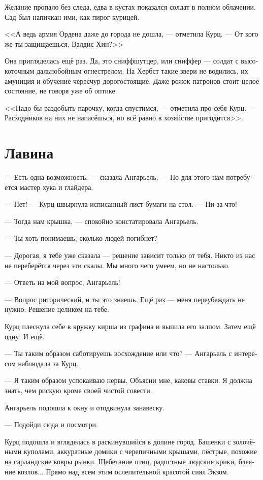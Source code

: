 \documentclass[a4paper,12pt,fleqn]{book}\usepackage{cooltooltips}\usepackage{polyglossia}\setdefaultlanguage[babelshorthands=true]{russian}\setotherlanguage{english}\defaultfontfeatures{Ligatures=TeX,Mapping=tex-text} \usepackage{xcolor}\definecolor{lightgray}{HTML}{bbbbbb}\color{lightgray}\newcommand{\ml}[3]{\textenglish{\textcolor{black}{#3}}}
\newcommand{\asterism}{\vspace{1em}{\centering\Large\bfseries$\ast~\ast~\ast$\par}\vspace{1em}}
\begin{document}
Желание пропало без следа, едва в кустах показался солдат в полном облачении.
Сад был напичкан ими, как пирог курицей.

<<А ведь армия Ордена даже до города не дошла, --- отметила Курц.
--- От кого же ты защищаешься, Валдис Хин?>>

Она пригляделась ещё раз.
Да, это сниффшутцер, или сниффер --- солдат с высокоточным дальнобойным огнестрелом.
На Хербст такие звери не водились, их амуниция и обучение чересчур дорогостоящие.
Даже рожок патронов стоит целое состояние, не говоря уже об оптике.

<<Надо бы раздобыть парочку, когда спустимся, --- отметила про себя Курц.
--- Расходников на них не напасёшься, но всё равно в хозяйстве пригодится>>.

\section{Лавина}

--- Есть одна возможность, --- сказала Ангарьель.
--- Но для этого нам потребуется мастер хука и глайдера.

\asterism

--- Нет! --- Курц швырнула исписанный лист бумаги на стол.
--- Ни за что!

--- Тогда нам крышка, --- спокойно констатировала Ангарьель.

--- Ты хоть понимаешь, сколько людей погибнет?

--- Дорогая, я тебе уже сказала --- решение зависит только от тебя.
Никто из нас не переберётся через эти скалы.
Мы много чего умеем, но не настолько.

--- Ответь на мой вопрос, Ангарьель!

--- Вопрос риторический, и ты это знаешь.
Ещё раз --- меня переубеждать не нужно.
Решение целиком на тебе.

Курц плеснула себе в кружку кирша из графина и выпила его залпом.
Затем ещё одну.
И ещё.

--- Ты таким образом саботируешь восхождение или что? --- Ангарьель с интересом наблюдала за Курц.

--- Я таким образом успокаиваю нервы.
Объясни мне, каковы ставки.
Я должна знать, чем рискую кроме своей чистой совести.

Ангарьель подошла к окну и отодвинула занавеску.

--- Подойди сюда и посмотри.

Курц подошла и вгляделась в раскинувшийся в долине город.
Башенки с золочёными куполами, аккуратные домики с черепичными крышами, пёстрые, похожие на сарландские ковры рынки.
Щебетание птиц, радостные людские крики, блеяние козлов...
Прямо над всем этим ослепительной красотой сиял Экзом.
\end{document}
